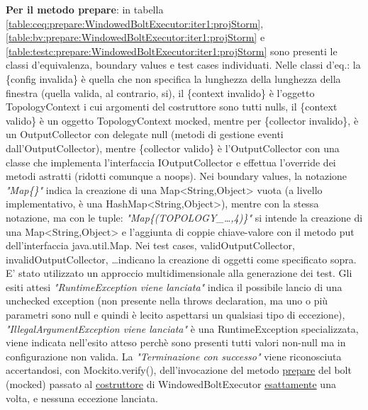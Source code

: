 \documentclass[10pt, a4paper]{article}
\newcommand{\gettablelabel}[5]{table:#1:#2:#3:iter#4:proj#5}
\def\storm{Storm}
\newcommand{\ceq}[1]{\{#1\}}
\begin{document}
	\textbf{Per il metodo prepare}: in tabella 
	\ref{\gettablelabel{ceq}{prepare}{WindowedBoltExecutor}{1}{\storm}},
	\ref{\gettablelabel{bv}{prepare}{WindowedBoltExecutor}{1}{\storm}} e 
	\ref{\gettablelabel{testc}{prepare}{WindowedBoltExecutor}{1}{\storm}} sono presenti le classi d'equivalenza, boundary values
	e test cases individuati. Nelle classi d'eq.: la \ceq{config invalida} è quella che non specifica la lunghezza della lunghezza
	della finestra (quella valida, al contrario, si), il \ceq{context invalido} è l'oggetto TopologyContext i cui argomenti del
	costruttore sono tutti nulls, il \ceq{context valido} è un oggetto TopologyContext mocked, mentre per \ceq{collector invalido},
	è un OutputCollector con delegate null (metodi di gestione eventi dall'OutputCollector), mentre \ceq{collector valido} è
	l'OutputCollector con una classe che implementa l'interfaccia IOutputCollector e effettua l'override dei metodi astratti
	(ridotti comunque a noops). Nei boundary values, la notazione \textit{"Map\{\}"} indica la creazione di una 
	Map<String,Object> vuota
	(a livello implementativo, è una HashMap<String,Object>), mentre con la stessa notazione, ma con le tuple: 
	\textit{"Map\{(TOPOLOGY\_\dots,4)\}"} si intende la creazione di una Map<String,Object> e l'aggiunta di coppie chiave-valore con il metodo put
	dell'interfaccia java.util.Map. Nei test cases, validOutputCollector, invalidOutputCollector, \dots indicano la creazione di
	oggetti come specificato sopra.
	E' stato utilizzato un approccio multidimensionale alla generazione dei test.
	Gli esiti attesi \textit{"RuntimeException viene lanciata"} indica il possibile lancio di una
	unchecked exception (non presente nella throws declaration, ma uno o più parametri sono null e quindi è lecito aspettarsi
	un qualsiasi tipo di eccezione), \textit{"IllegalArgumentException viene lanciata"} è una RuntimeException specializzata,
	viene indicata nell'esito atteso perchè sono presenti tutti valori non-null ma in configurazione non valida.
	La \textit{"Terminazione con successo"} viene riconosciuta accertandosi, con Mockito.verify(), dell'invocazione del metodo 
	\href{https://storm.apache.org/releases/2.6.2/javadocs/org/apache/storm/task/IBolt.html#prepare(java.util.Map,org.apache.storm.task.TopologyContext,org.apache.storm.task.OutputCollector)}
	{prepare} 
	del bolt (mocked) passato al 
	\href{https://storm.apache.org/releases/2.6.2/javadocs/org/apache/storm/topology/WindowedBoltExecutor.html#\%3Cinit\%3E(org.apache.storm.topology.IWindowedBolt)}
	{costruttore} 
	di WindowedBoltExecutor	\underline{esattamente} una volta, e nessuna eccezione lanciata. 
\end{document}
